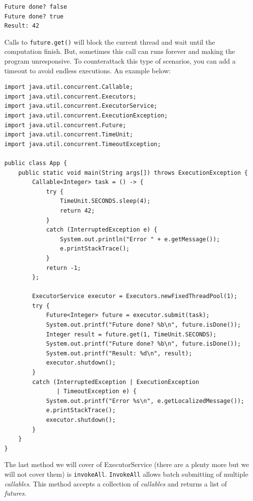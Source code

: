 \documentclass{latex/classes/thesis}
\begin{document}
\begin{enumerate}
\begin{verbatim}
Future done? false
Future done? true
Result: 42
\end{verbatim}



Calls to \texttt{future.get()} will block the current thread and wait until the
computation finish. But, sometimes this call can runs forever and making the
program unresponsive. To counterattack this type of scenarios, you can add a
timeout to avoid endless executions. An example below:

\begin{lstlisting}
import java.util.concurrent.Callable;
import java.util.concurrent.Executors;
import java.util.concurrent.ExecutorService;
import java.util.concurrent.ExecutionException;
import java.util.concurrent.Future;
import java.util.concurrent.TimeUnit;
import java.util.concurrent.TimeoutException;

public class App {
    public static void main(String args[]) throws ExecutionException {
        Callable<Integer> task = () -> {
            try {
                TimeUnit.SECONDS.sleep(4);
                return 42;
            }
            catch (InterruptedException e) {
                System.out.println("Error " + e.getMessage());
                e.printStackTrace();
            }
            return -1;
        };

        ExecutorService executor = Executors.newFixedThreadPool(1);
        try {
            Future<Integer> future = executor.submit(task);
            System.out.printf("Future done? %b\n", future.isDone());
            Integer result = future.get(1, TimeUnit.SECONDS);
            System.out.printf("Future done? %b\n", future.isDone());
            System.out.printf("Result: %d\n", result);
            executor.shutdown();
        }
        catch (InterruptedException | ExecutionException
               | TimeoutException e) {
            System.out.printf("Error %s\n", e.getLocalizedMessage());
            e.printStackTrace();
            executor.shutdown();
        }
    }
}
\end{lstlisting}


The last method we will cover of ExecutorService (there are a plenty more
but we will not cover them) is \texttt{invokeAll}. \texttt{InvokeAll} allows batch submitting
of multiple \emph{callables}. This method accepts a collection of \emph{callables} and
returns a list of \emph{futures}.


\end{enumerate}
\end{document}
